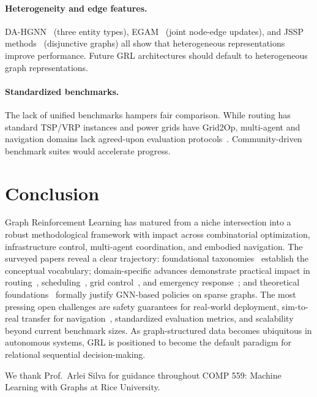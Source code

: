 \documentclass{article}
\begin{document}
\paragraph{Heterogeneity and edge features.}
DA-HGNN~\cite{dualattn2026} (three entity types), EGAM~\cite{egam2026} (joint node-edge updates), and JSSP methods~\cite{zhang2024jsp} (disjunctive graphs) all show that heterogeneous representations improve performance. Future GRL architectures should default to heterogeneous graph representations.

\paragraph{Standardized benchmarks.}
The lack of unified benchmarks hampers fair comparison. While routing has standard TSP/VRP instances and power grids have Grid2Op, multi-agent and navigation domains lack agreed-upon evaluation protocols~\cite{socialnav2025}. Community-driven benchmark suites would accelerate progress.

\section{Conclusion}
\label{sec:conclusion}

Graph Reinforcement Learning has matured from a niche intersection into a robust methodological framework with impact across combinatorial optimization, infrastructure control, multi-agent coordination, and embodied navigation. The surveyed papers reveal a clear trajectory: foundational taxonomies~\cite{nie2023, berto2024} establish the conceptual vocabulary; domain-specific advances demonstrate practical impact in routing~\cite{egam2026, qgat2025}, scheduling~\cite{zhang2024jsp}, grid control~\cite{powergrid2025}, and emergency response~\cite{qjl2026}; and theoretical foundations~\cite{mfc2026} formally justify GNN-based policies on sparse graphs. The most pressing open challenges are safety guarantees for real-world deployment, sim-to-real transfer for navigation~\cite{socialnav2025}, standardized evaluation metrics, and scalability beyond current benchmark sizes. As graph-structured data becomes ubiquitous in autonomous systems, GRL is positioned to become the default paradigm for relational sequential decision-making.

\begin{ack}
We thank Prof.\ Arlei Silva for guidance throughout COMP 559: Machine Learning with Graphs at Rice University.
\end{ack}
\end{document}
